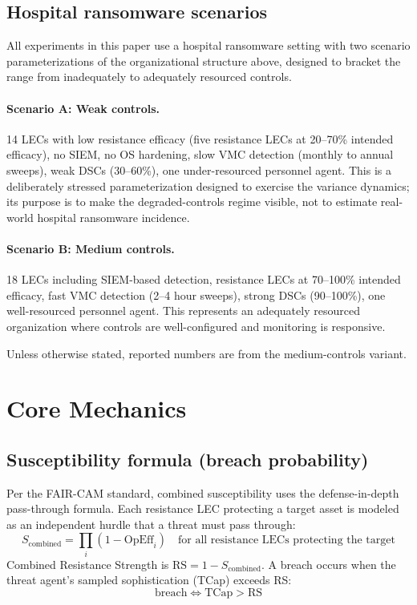 \documentclass[11pt,a4paper]{article}
\begin{document}
\subsection{Hospital ransomware scenarios}
\label{sec:scenarios}

All experiments in this paper use a hospital ransomware setting with two scenario parameterizations of the organizational structure above, designed to bracket the range from inadequately to adequately resourced controls.

\paragraph{Scenario A: Weak controls.} 14 LECs with low resistance efficacy (five resistance LECs at 20--70\% intended efficacy), no SIEM, no OS hardening, slow VMC detection (monthly to annual sweeps), weak DSCs (30--60\%), one under-resourced personnel agent. This is a deliberately stressed parameterization designed to exercise the variance dynamics; its purpose is to make the degraded-controls regime visible, not to estimate real-world hospital ransomware incidence.

\paragraph{Scenario B: Medium controls.} 18 LECs including SIEM-based detection, resistance LECs at 70--100\% intended efficacy, fast VMC detection (2--4 hour sweeps), strong DSCs (90--100\%), one well-resourced personnel agent. This represents an adequately resourced organization where controls are well-configured and monitoring is responsive.

Unless otherwise stated, reported numbers are from the medium-controls variant.

\section{Core Mechanics}

\subsection{Susceptibility formula (breach probability)}

Per the FAIR-CAM standard, combined susceptibility uses the defense-in-depth pass-through formula. Each resistance LEC protecting a target asset is modeled as an independent hurdle that a threat must pass through:
\begin{equation}
    S_{\text{combined}} = \prod_{i} (1 - \mathrm{OpEff}_i) \quad \text{for all resistance LECs protecting the target}
    \label{eq:suscept-detail}
\end{equation}
Combined Resistance Strength is $\mathrm{RS} = 1 - S_{\text{combined}}$. A breach occurs when the threat agent's sampled sophistication (TCap) exceeds RS:
\[
    \text{breach} \iff \mathrm{TCap} > \mathrm{RS}
\]
\end{document}
